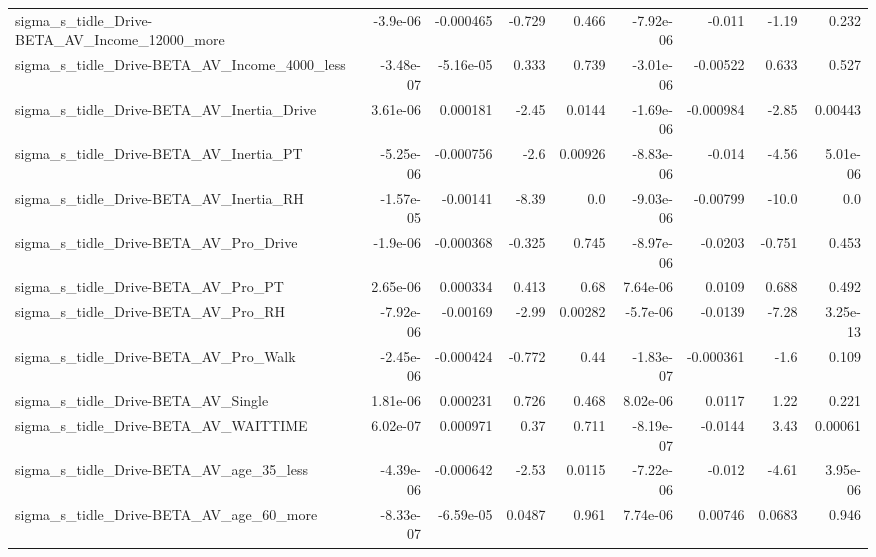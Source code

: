 \begin{tabular}{lrrrrrrrr}
sigma\_s\_tidle\_Drive-BETA\_AV\_Income\_12000\_more      &    -3.9e-06 &    -0.000465 &   -0.729 &    0.466 &  -7.92e-06 &      -0.011 &        -1.19 &         0.232 \\
sigma\_s\_tidle\_Drive-BETA\_AV\_Income\_4000\_less       &   -3.48e-07 &    -5.16e-05 &    0.333 &    0.739 &  -3.01e-06 &    -0.00522 &        0.633 &         0.527 \\
sigma\_s\_tidle\_Drive-BETA\_AV\_Inertia\_Drive          &    3.61e-06 &     0.000181 &    -2.45 &   0.0144 &  -1.69e-06 &   -0.000984 &        -2.85 &       0.00443 \\
sigma\_s\_tidle\_Drive-BETA\_AV\_Inertia\_PT             &   -5.25e-06 &    -0.000756 &     -2.6 &  0.00926 &  -8.83e-06 &      -0.014 &        -4.56 &      5.01e-06 \\
sigma\_s\_tidle\_Drive-BETA\_AV\_Inertia\_RH             &   -1.57e-05 &     -0.00141 &    -8.39 &      0.0 &  -9.03e-06 &    -0.00799 &        -10.0 &           0.0 \\
sigma\_s\_tidle\_Drive-BETA\_AV\_Pro\_Drive              &    -1.9e-06 &    -0.000368 &   -0.325 &    0.745 &  -8.97e-06 &     -0.0203 &       -0.751 &         0.453 \\
sigma\_s\_tidle\_Drive-BETA\_AV\_Pro\_PT                 &    2.65e-06 &     0.000334 &    0.413 &     0.68 &   7.64e-06 &      0.0109 &        0.688 &         0.492 \\
sigma\_s\_tidle\_Drive-BETA\_AV\_Pro\_RH                 &   -7.92e-06 &     -0.00169 &    -2.99 &  0.00282 &   -5.7e-06 &     -0.0139 &        -7.28 &      3.25e-13 \\
sigma\_s\_tidle\_Drive-BETA\_AV\_Pro\_Walk               &   -2.45e-06 &    -0.000424 &   -0.772 &     0.44 &  -1.83e-07 &   -0.000361 &         -1.6 &         0.109 \\
sigma\_s\_tidle\_Drive-BETA\_AV\_Single                 &    1.81e-06 &     0.000231 &    0.726 &    0.468 &   8.02e-06 &      0.0117 &         1.22 &         0.221 \\
sigma\_s\_tidle\_Drive-BETA\_AV\_WAITTIME               &    6.02e-07 &     0.000971 &     0.37 &    0.711 &  -8.19e-07 &     -0.0144 &         3.43 &       0.00061 \\
sigma\_s\_tidle\_Drive-BETA\_AV\_age\_35\_less            &   -4.39e-06 &    -0.000642 &    -2.53 &   0.0115 &  -7.22e-06 &      -0.012 &        -4.61 &      3.95e-06 \\
sigma\_s\_tidle\_Drive-BETA\_AV\_age\_60\_more            &   -8.33e-07 &    -6.59e-05 &   0.0487 &    0.961 &   7.74e-06 &     0.00746 &       0.0683 &         0.946 \\

\end{tabular}
